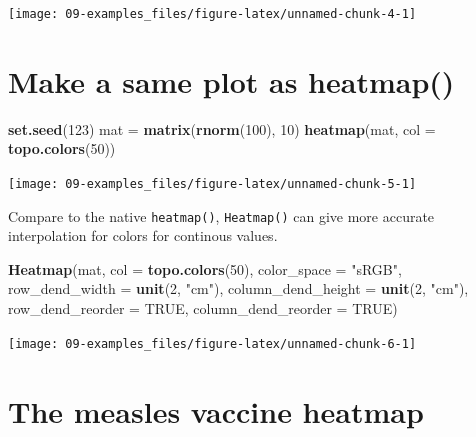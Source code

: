 \documentclass[]{book}
\newenvironment{Shaded}{\begin{snugshade}}{\end{snugshade}}
\newcommand{\KeywordTok}[1]{\textcolor[rgb]{0.13,0.29,0.53}{\textbf{#1}}}
\newcommand{\DataTypeTok}[1]{\textcolor[rgb]{0.13,0.29,0.53}{#1}}
\newcommand{\DecValTok}[1]{\textcolor[rgb]{0.00,0.00,0.81}{#1}}
\newcommand{\StringTok}[1]{\textcolor[rgb]{0.31,0.60,0.02}{#1}}
\newcommand{\OtherTok}[1]{\textcolor[rgb]{0.56,0.35,0.01}{#1}}
\newcommand{\NormalTok}[1]{#1}
\theoremstyle{definition}
\theoremstyle{definition}
\theoremstyle{definition}
\theoremstyle{remark}
\begin{document}
\begin{center}\texttt{[image: 09-examples\_files/figure-latex/unnamed-chunk-4-1]} \end{center}

\section{Make a same plot as
heatmap()}\label{make-a-same-plot-as-heatmap}

\begin{Shaded}
\begin{Highlighting}[]
\KeywordTok{set.seed}\NormalTok{(}\DecValTok{123}\NormalTok{)}
\NormalTok{mat =}\StringTok{ }\KeywordTok{matrix}\NormalTok{(}\KeywordTok{rnorm}\NormalTok{(}\DecValTok{100}\NormalTok{), }\DecValTok{10}\NormalTok{)}
\KeywordTok{heatmap}\NormalTok{(mat, }\DataTypeTok{col =} \KeywordTok{topo.colors}\NormalTok{(}\DecValTok{50}\NormalTok{))}
\end{Highlighting}
\end{Shaded}

\begin{center}\texttt{[image: 09-examples\_files/figure-latex/unnamed-chunk-5-1]} \end{center}

Compare to the native \texttt{heatmap()}, \texttt{Heatmap()} can give
more accurate interpolation for colors for continous values.

\begin{Shaded}
\begin{Highlighting}[]
\KeywordTok{Heatmap}\NormalTok{(mat, }\DataTypeTok{col =} \KeywordTok{topo.colors}\NormalTok{(}\DecValTok{50}\NormalTok{), }\DataTypeTok{color_space =} \StringTok{"sRGB"}\NormalTok{,}
    \DataTypeTok{row_dend_width =} \KeywordTok{unit}\NormalTok{(}\DecValTok{2}\NormalTok{, }\StringTok{"cm"}\NormalTok{), }
    \DataTypeTok{column_dend_height =} \KeywordTok{unit}\NormalTok{(}\DecValTok{2}\NormalTok{, }\StringTok{"cm"}\NormalTok{), }\DataTypeTok{row_dend_reorder =} \OtherTok{TRUE}\NormalTok{,}
    \DataTypeTok{column_dend_reorder =} \OtherTok{TRUE}\NormalTok{)}
\end{Highlighting}
\end{Shaded}

\begin{center}\texttt{[image: 09-examples\_files/figure-latex/unnamed-chunk-6-1]} \end{center}

\section{The measles vaccine heatmap}\label{the-measles-vaccine-heatmap}
\end{document}
